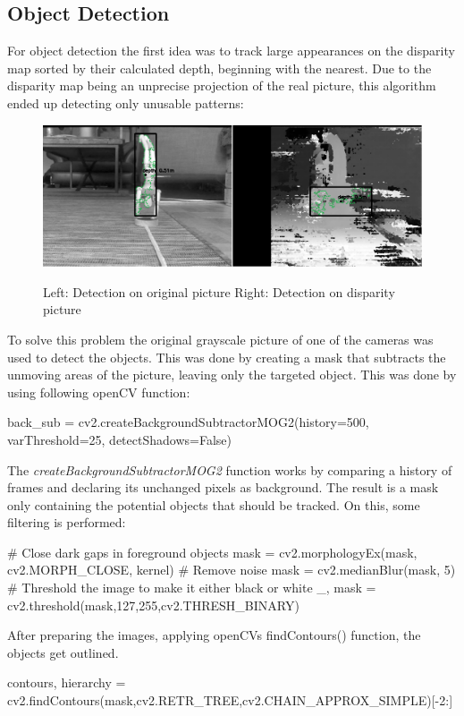 \documentclass[journal,onecolumn]{IEEEtran}
\begin{document}
\subsection{Object Detection}
\noindent For object detection the first idea was to track large appearances on the disparity map sorted by their calculated depth, beginning with the nearest. Due to the disparity map being an unprecise projection of the real picture, this algorithm ended up detecting only unusable patterns:
\begin{figure}[H]
	\centering
	\includegraphics[scale=0.5]{handstand_comparison.png}
	\label{tracking}
	\captionsetup{justification=centering}
	\caption{Left: Detection on original picture Right: Detection on disparity picture }
\end{figure}
\noindent To solve this problem the original grayscale picture of one of the cameras was used to detect the objects. This was done by creating a mask that subtracts the unmoving areas of the picture, leaving only the targeted object. This was done by using following openCV function:
\begin{python}
back_sub = cv2.createBackgroundSubtractorMOG2(history=500, varThreshold=25, detectShadows=False)
\end{python}
\noindent The  \emph{createBackgroundSubtractorMOG2} function works by comparing a history of frames and declaring its unchanged pixels as background. The result is a mask only containing the potential objects that should be tracked. On this, some filtering is performed:
\begin{python}
# Close dark gaps in foreground objects
mask = cv2.morphologyEx(mask, cv2.MORPH_CLOSE, kernel)
# Remove noise
mask = cv2.medianBlur(mask, 5)
# Threshold the image to make it either black or white
_, mask = cv2.threshold(mask,127,255,cv2.THRESH_BINARY)
\end{python}
\noindent After preparing the images, applying openCVs findContours() function, the objects get outlined.
\begin{python}
contours, hierarchy = cv2.findContours(mask,cv2.RETR_TREE,cv2.CHAIN_APPROX_SIMPLE)[-2:]
\end{python}
\end{document}
